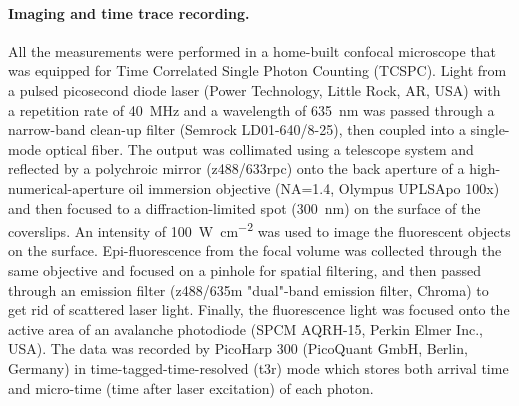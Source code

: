 \paragraph*{Imaging and time trace recording.} All the measurements were performed in a home-built confocal microscope that was equipped for Time Correlated Single Photon Counting (TCSPC).
Light from a pulsed picosecond diode laser (Power Technology, Little Rock, AR, USA) with a repetition rate of \SI{40}{\MHz} and a wavelength of \SI{635}{\nm} was passed through a narrow-band clean-up filter (Semrock LD01-640/8-25), then coupled into a single-mode optical fiber.
The output was collimated using a telescope system and reflected by a polychroic mirror (z488/633rpc) onto the back aperture of a high-numerical-aperture oil immersion objective (NA=1.4, Olympus UPLSApo 100x) and then focused to a diffraction-limited spot (\SI{300}{\nm}) on the surface of the coverslips.
An intensity of \SI[per-mode=repeated-symbol]{100}{\watt\per\cm\squared} was used to image the fluorescent objects on the surface.
Epi-fluorescence from the focal volume was collected through the same objective and focused on a pinhole for spatial filtering, and then passed through an emission filter (z488/635m "dual"-band emission filter, Chroma) to get rid of scattered laser light.
Finally, the fluorescence light was focused onto the active area of an avalanche photodiode (SPCM AQRH-15, Perkin Elmer Inc., USA).
The data was recorded by PicoHarp 300 (PicoQuant GmbH, Berlin, Germany) in time-tagged-time-resolved (t3r) mode which stores both arrival time and micro-time (time after laser excitation) of each photon.


